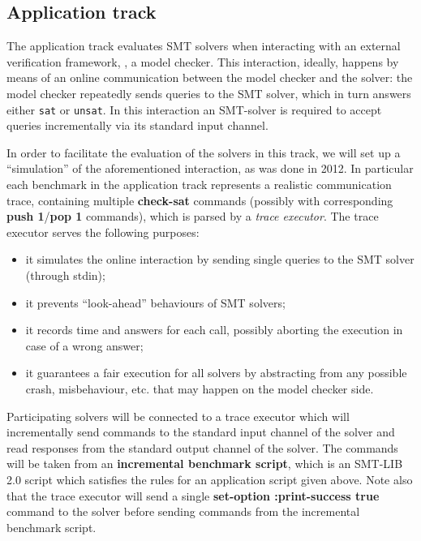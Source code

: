 \documentclass[12pt]{article}
\newcommand{\akey}[1]{\textbf{#1}}
\begin{document}
\subsection{Application track}
\label{sec:exec:application}

The application track evaluates SMT solvers when interacting
with an external verification framework, \eg, a model
checker. This interaction, ideally, happens by means of an online
communication between the model checker and the solver: the model
checker repeatedly sends queries to the SMT solver, which in turn
answers either \texttt{sat} or \texttt{unsat}.  In this interaction an SMT-solver is
required to accept queries incrementally via its standard input channel.

In order to facilitate the evaluation of the solvers in this track, we
will set up a ``simulation'' of the aforementioned interaction, as was done in 2012. In
particular each benchmark in the application track represents a realistic
communication trace, containing multiple \akey{check-sat} commands (possibly
with corresponding \akey{push 1}/\akey{pop 1} commands), which
is parsed by a {\em trace executor}. The trace executor serves the following purposes:
\begin{itemize}
\item it simulates the online interaction by sending single queries to the SMT solver
      (through stdin);
\item it prevents ``look-ahead'' behaviours of SMT solvers;
\item it records time and answers for each call, possibly aborting the execution
      in case of a wrong answer;
\item it guarantees a fair execution for all solvers by abstracting from any possible
      crash, misbehaviour, etc. that may happen on the model checker side.
\end{itemize}

Participating solvers will be connected to a trace executor 
which will incrementally send commands to the standard input channel of the solver
and read responses from the standard output channel of the solver.
The commands will be taken from an \textbf{incremental benchmark script},
which is an SMT-LIB 2.0 script which satisfies the rules for an application script given above.
Note also that the trace executor will send a single 
\akey{set-option :print-success true} command to the solver before 
sending commands from the incremental benchmark script.
\end{document}

